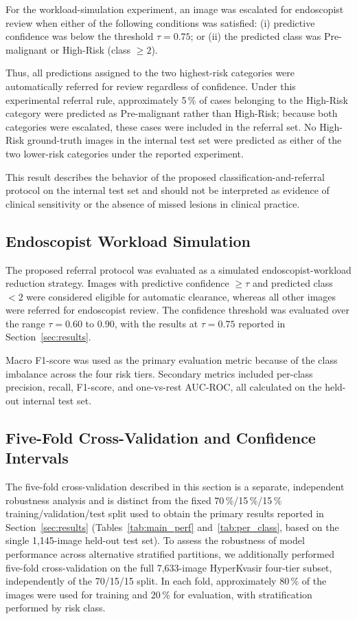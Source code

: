 \documentclass[11pt,a4paper]{article}
\begin{document}
For the workload-simulation experiment, an image was escalated for
endoscopist review when either of the following conditions was satisfied:
(i) predictive confidence was below the threshold $\tau=0.75$; or
(ii) the predicted class was Pre-malignant or High-Risk (class $\geq2$).

Thus, all predictions assigned to the two highest-risk categories were
automatically referred for review regardless of confidence. Under this
experimental referral rule, approximately 5\,\% of cases belonging to the
High-Risk category were predicted as Pre-malignant rather than High-Risk;
because both categories were escalated, these cases were included in the
referral set. No High-Risk ground-truth images in the internal test set were
predicted as either of the two lower-risk categories under the reported
experiment.

This result describes the behavior of the proposed classification-and-referral
protocol on the internal test set and should not be interpreted as evidence of
clinical sensitivity or the absence of missed lesions in clinical practice.

\subsection{Endoscopist Workload Simulation}
\label{sec:workload}

The proposed referral protocol was evaluated as a simulated
endoscopist-workload reduction strategy. Images with predictive confidence
$\geq\tau$ and predicted class $<2$ were considered eligible for automatic
clearance, whereas all other images were referred for endoscopist review.
The confidence threshold was evaluated over the range $\tau=0.60$ to $0.90$,
with the results at $\tau=0.75$ reported in Section~\ref{sec:results}.

Macro F1-score was used as the primary evaluation metric because of the class
imbalance across the four risk tiers. Secondary metrics included per-class
precision, recall, F1-score, and one-vs-rest AUC-ROC, all calculated on the
held-out internal test set.

\subsection{Five-Fold Cross-Validation and Confidence Intervals}
\label{sec:kfold}

The five-fold cross-validation described in this section is a separate,
independent robustness analysis and is distinct from the fixed 70\,\%/15\,\%/15\,\%
training/validation/test split used to obtain the primary results reported
in Section~\ref{sec:results} (Tables~\ref{tab:main_perf}
and~\ref{tab:per_class}, based on the single 1,145-image held-out test set).
To assess the robustness of model performance across alternative stratified
partitions, we additionally performed five-fold cross-validation on the
full 7,633-image HyperKvasir four-tier subset, independently of the 70/15/15
split. In each fold, approximately 80\,\% of the images were used for training and 20\,\%
for evaluation, with stratification performed by risk class.
\end{document}

